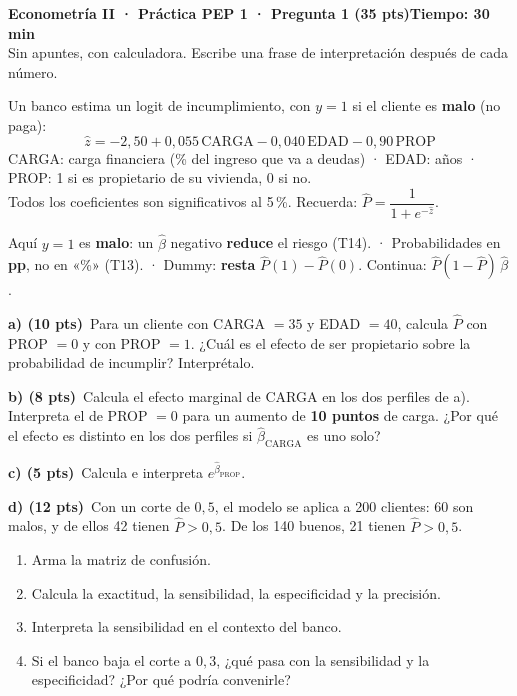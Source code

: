 \documentclass[11pt]{article}
\newcommand{\desarrollo}{%
  \begin{tcolorbox}[cuadri,height fill]
  \end{tcolorbox}}
\newcommand{\parte}[2]{%
  \begin{tcolorbox}[colback=blue!4,colframe=blue!50!black,boxrule=0.5pt,left=4pt,right=4pt,top=3pt,bottom=3pt]
  \textbf{#1}\ #2
  \end{tcolorbox}}
\begin{document}
\textbf{\large Econometría II · Práctica PEP 1 · Pregunta 1 (35 pts)}\hfill \textbf{Tiempo: 30 min}\\[2pt]
Sin apuntes, con calculadora. Escribe una frase de interpretación después de cada número.

\vspace{4pt}
\begin{tcolorbox}[colback=blue!4,colframe=blue!50!black,title=Riesgo de crédito]
Un banco estima un logit de incumplimiento, con $y=1$ si el cliente es \textbf{malo} (no paga):
\[
\hat z = -2{,}50 + 0{,}055\,\text{CARGA} - 0{,}040\,\text{EDAD} - 0{,}90\,\text{PROP}
\]
CARGA: carga financiera (\% del ingreso que va a deudas) · EDAD: años · PROP: 1 si es propietario de su vivienda, 0 si no.\\
Todos los coeficientes son significativos al 5\,\%. \quad Recuerda: $\hat P = \dfrac{1}{1+e^{-\hat z}}$.
\end{tcolorbox}

\begin{tcolorbox}[colback=orange!6,colframe=orange!70!black,boxrule=0.5pt,left=4pt,top=2pt,bottom=2pt]
\small Aquí $y=1$ es \textbf{malo}: un $\hat\beta$ negativo \textbf{reduce} el riesgo (T14). · Probabilidades en \textbf{pp}, no en «\%» (T13). · Dummy: \textbf{resta} $\hat P(1)-\hat P(0)$. Continua: $\hat P(1-\hat P)\,\hat\beta$.
\end{tcolorbox}

\parte{a) (10 pts)}{Para un cliente con CARGA $=35$ y EDAD $=40$, calcula $\hat P$ con PROP $=0$ y con PROP $=1$. ¿Cuál es el efecto de ser propietario sobre la probabilidad de incumplir? Interprétalo.}
\desarrollo

\newpage
\parte{b) (8 pts)}{Calcula el efecto marginal de CARGA en los dos perfiles de a). Interpreta el de PROP $=0$ para un aumento de \textbf{10 puntos} de carga. ¿Por qué el efecto es distinto en los dos perfiles si $\hat\beta_{\text{CARGA}}$ es uno solo?}
\begin{tcolorbox}[cuadri,height=13.5cm]
\end{tcolorbox}

\parte{c) (5 pts)}{Calcula e interpreta $e^{\hat\beta_{\text{PROP}}}$.}
\desarrollo

\newpage
\parte{d) (12 pts)}{Con un corte de $0{,}5$, el modelo se aplica a 200 clientes: 60 son malos, y de ellos 42 tienen $\hat P>0{,}5$. De los 140 buenos, 21 tienen $\hat P>0{,}5$.
\begin{enumerate}[label=\arabic*.,itemsep=0pt,topsep=2pt]
  \item Arma la matriz de confusión.
  \item Calcula la exactitud, la sensibilidad, la especificidad y la precisión.
  \item Interpreta la sensibilidad en el contexto del banco.
  \item Si el banco baja el corte a $0{,}3$, ¿qué pasa con la sensibilidad y la especificidad? ¿Por qué podría convenirle?
\end{enumerate}}
\end{document}
